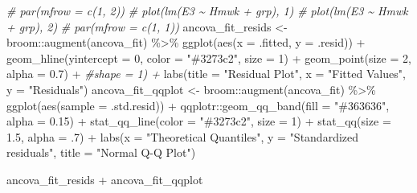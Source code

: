 \documentclass[
]{book}
\newenvironment{Shaded}{\begin{snugshade}}{\end{snugshade}}
\newcommand{\AttributeTok}[1]{\textcolor[rgb]{0.77,0.63,0.00}{#1}}
\newcommand{\CommentTok}[1]{\textcolor[rgb]{0.56,0.35,0.01}{\textit{#1}}}
\newcommand{\DecValTok}[1]{\textcolor[rgb]{0.00,0.00,0.81}{#1}}
\newcommand{\FloatTok}[1]{\textcolor[rgb]{0.00,0.00,0.81}{#1}}
\newcommand{\FunctionTok}[1]{\textcolor[rgb]{0.00,0.00,0.00}{#1}}
\newcommand{\NormalTok}[1]{#1}
\newcommand{\OtherTok}[1]{\textcolor[rgb]{0.56,0.35,0.01}{#1}}
\newcommand{\SpecialCharTok}[1]{\textcolor[rgb]{0.00,0.00,0.00}{#1}}
\newcommand{\StringTok}[1]{\textcolor[rgb]{0.31,0.60,0.02}{#1}}
\begin{document}
\begin{Shaded}
\begin{Highlighting}[]
\CommentTok{\# par(mfrow = c(1, 2))}
\CommentTok{\# plot(lm(E3 \textasciitilde{} Hmwk + grp), 1)}
\CommentTok{\# plot(lm(E3 \textasciitilde{} Hmwk + grp), 2)}
\CommentTok{\# par(mfrow = c(1, 1))}
\NormalTok{ancova\_fit\_resids }\OtherTok{\textless{}{-}}\NormalTok{ broom}\SpecialCharTok{::}\FunctionTok{augment}\NormalTok{(ancova\_fit) }\SpecialCharTok{\%\textgreater{}\%} 
  \FunctionTok{ggplot}\NormalTok{(}\FunctionTok{aes}\NormalTok{(}\AttributeTok{x =}\NormalTok{ .fitted, }\AttributeTok{y =}\NormalTok{ .resid)) }\SpecialCharTok{+} 
  \FunctionTok{geom\_hline}\NormalTok{(}\AttributeTok{yintercept =} \DecValTok{0}\NormalTok{, }\AttributeTok{color =} \StringTok{"\#3273c2"}\NormalTok{, }\AttributeTok{size =} \DecValTok{1}\NormalTok{) }\SpecialCharTok{+}
  \FunctionTok{geom\_point}\NormalTok{(}\AttributeTok{size =} \DecValTok{2}\NormalTok{, }\AttributeTok{alpha =} \FloatTok{0.7}\NormalTok{) }\SpecialCharTok{+} \CommentTok{\#shape = 1) +}
  \FunctionTok{labs}\NormalTok{(}\AttributeTok{title =} \StringTok{"Residual Plot"}\NormalTok{, }
       \AttributeTok{x =} \StringTok{"Fitted Values"}\NormalTok{, }
       \AttributeTok{y =} \StringTok{"Residuals"}\NormalTok{)}
\NormalTok{ancova\_fit\_qqplot }\OtherTok{\textless{}{-}}\NormalTok{ broom}\SpecialCharTok{::}\FunctionTok{augment}\NormalTok{(ancova\_fit) }\SpecialCharTok{\%\textgreater{}\%} 
  \FunctionTok{ggplot}\NormalTok{(}\FunctionTok{aes}\NormalTok{(}\AttributeTok{sample =}\NormalTok{ .std.resid)) }\SpecialCharTok{+}
\NormalTok{  qqplotr}\SpecialCharTok{::}\FunctionTok{geom\_qq\_band}\NormalTok{(}\AttributeTok{fill =} \StringTok{"\#363636"}\NormalTok{, }\AttributeTok{alpha =} \FloatTok{0.15}\NormalTok{) }\SpecialCharTok{+}
  \FunctionTok{stat\_qq\_line}\NormalTok{(}\AttributeTok{color =} \StringTok{"\#3273c2"}\NormalTok{, }\AttributeTok{size =} \DecValTok{1}\NormalTok{) }\SpecialCharTok{+}
  \FunctionTok{stat\_qq}\NormalTok{(}\AttributeTok{size =} \FloatTok{1.5}\NormalTok{, }\AttributeTok{alpha =}\NormalTok{ .}\DecValTok{7}\NormalTok{) }\SpecialCharTok{+}
  \FunctionTok{labs}\NormalTok{(}\AttributeTok{x =} \StringTok{"Theoretical Quantiles"}\NormalTok{,}
       \AttributeTok{y =} \StringTok{"Standardized residuals"}\NormalTok{,}
       \AttributeTok{title =} \StringTok{"Normal Q{-}Q Plot"}\NormalTok{)}

\NormalTok{ancova\_fit\_resids }\SpecialCharTok{+}\NormalTok{ ancova\_fit\_qqplot}
\end{Highlighting}
\end{Shaded}
\end{document}
